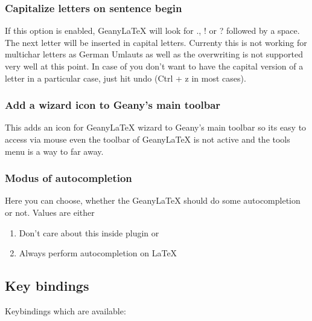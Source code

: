 \documentclass[%
paper=a4,%
fontsize=11pt,%
twoside=false,%
DIV18,%
headsepline,%
plainheadsepline,%
footsepline,%
plainfootsepline,%
bibliography=totoc,%
listof=totoc,%
BCOR10mm,%
parskip=half,%
openany,%
]{scrartcl}
\begin{document}
\subsubsection{Capitalize letters on sentence begin}

If this option is enabled, Geany\LaTeX{} will look for \textsc{.},
\textsc{!} or \textsc{?} followed by a space. The next letter will
be inserted in capital letters. Currenty this is not working for
multichar letters as German Umlauts as well as the overwriting is
not supported very well at this point. In case of you don't want to
have the capital version of a letter in a particular case, just hit
undo (Ctrl + z in most cases).

\subsubsection{Add a wizard icon to Geany's main toolbar}
This adds an icon for Geany\LaTeX{} wizard to Geany's main toolbar
so its easy to access via mouse even the toolbar of Geany\LaTeX{} is
not active and the tools menu is a way to far away.

\subsubsection{Modus of autocompletion}
\label{sec:modus_of_autocompletion}
Here you can choose, whether the Geany\LaTeX{} should do some
autocompletion or not. Values are either
\begin{enumerate}
	\item Don't care about this inside plugin or
	\item Always perform autocompletion on LaTeX
\end{enumerate}

\subsection{Key bindings}
\label{sec:key_bindings}
Keybindings which are available:
\end{document}
